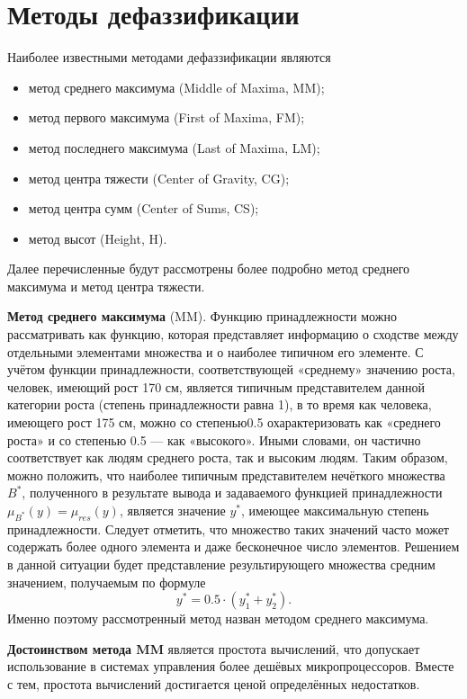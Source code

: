 \section{Методы дефаззификации}

Наиболее известными методами дефаззификации являются
\begin{itemize}[label*=---]
	\item метод среднего максимума (Middle of Maxima, MM);
	\item метод первого максимума (First of Maxima, FM);
	\item метод последнего максимума (Last of Maxima, LM);
	\item метод центра тяжести (Center of Gravity, CG);
	\item метод центра сумм (Center of Sums, CS);
	\item метод высот (Height, H).~\cite{book}
\end{itemize}

Далее перечисленные будут рассмотрены более подробно метод среднего максимума и метод центра тяжести.~\cite{book}

\textbf{Метод среднего максимума} (MM). Функцию принадлежности можно рассматривать как функцию, которая представляет информацию о сходстве между отдельными элементами множества и о наиболее типичном его элементе.
С учётом функции принадлежности, соответствующей «среднему»
значению роста, человек, имеющий рост 170 см, является типичным
представителем данной категории роста (степень принадлежности равна 1), в то время как человека, имеющего рост 175 см, можно со степенью0.5 охарактеризовать как «среднего роста» и со степенью 0.5 —
как «высокого». Иными словами, он частично соответствует как людям
среднего роста, так и высоким людям. Таким образом, можно положить, что наиболее типичным представителем нечёткого множества $B^*$, полученного в результате вывода и задаваемого функцией принадлежности
$\mu_{B^*}(y) = \mu_{res}(y)$, является значение $y^*$, имеющее максимальную степень
принадлежности.
Следует отметить, что множество таких значений часто может содержать более одного элемента и даже бесконечное число элементов. Решением в данной ситуации будет представление
результирующего множества средним значением, получаемым по формуле
\begin{equation}
	y^* = 0.5 \cdot (y_1^* + y_2^*).
\end{equation}
Именно поэтому рассмотренный метод назван методом среднего максимума.~\cite{book}

\textbf{Достоинством метода MM} является простота вычислений, что
допускает использование в системах управления более дешёвых микропроцессоров. Вместе с тем, простота вычислений достигается ценой
определённых недостатков.~\cite{book}

